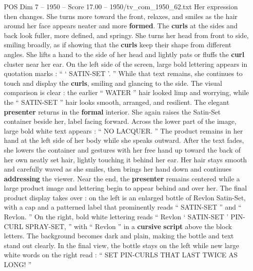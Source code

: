 \begin{textsample}{POS Dim 7 – 1950 – Score 17.00 – 1950/tv\_com\_1950\_62.txt}
Her expression then changes.
She turns more toward the front, relaxes, and smiles as the hair around her face appears neater and more \textbf{formed}.
The \textbf{curls} at the sides and back look fuller, more defined, and springy.
She turns her head from front to side, smiling broadly, as if showing that the \textbf{curls} keep their shape from different angles.
She lifts a hand to the side of her head and lightly pats or fluffs the \textbf{curl} cluster near her ear.
On the left side of the screen, large bold lettering appears in quotation marks : “ ‘ SATIN-SET ’. ” While that text remains, she continues to touch and display the \textbf{curls}, smiling and glancing to the side.
The visual comparison is clear : the earlier “ WATER ” hair looked limp and worrying, while the “ SATIN-SET ” hair looks smooth, arranged, and resilient.
The elegant \textbf{presenter} returns in the \textbf{formal} interior.
She again raises the Satin-Set container beside her, label facing forward.
Across the lower part of the image, large bold white text appears : “ NO LACQUER. ” The product remains in her hand at the left side of her body while she speaks outward.
After the text fades, she lowers the container and gestures with her free hand up toward the back of her own neatly set hair, lightly touching it behind her ear.
Her hair stays smooth and carefully waved as she smiles, then brings her hand down and continues \textbf{addressing} the viewer.
Near the end, the \textbf{presenter} remains centered while a large product image and lettering begin to appear behind and over her.
The final product display takes over : on the left is an enlarged bottle of Revlon Satin-Set, with a cap and a patterned label that prominently reads “ SATIN-SET ” and “ Revlon. ” On the right, bold white lettering reads “ Revlon ‘ SATIN-SET ’ PIN-CURL SPRAY-SET, ” with “ Revlon ” in a \textbf{cursive} \textbf{script} above the block letters.
The background becomes dark and plain, making the bottle and text stand out clearly.
In the final view, the bottle stays on the left while new large white words on the right read : “ SET PIN-CURLS THAT LAST TWICE AS LONG! ”

\end{textsample}
